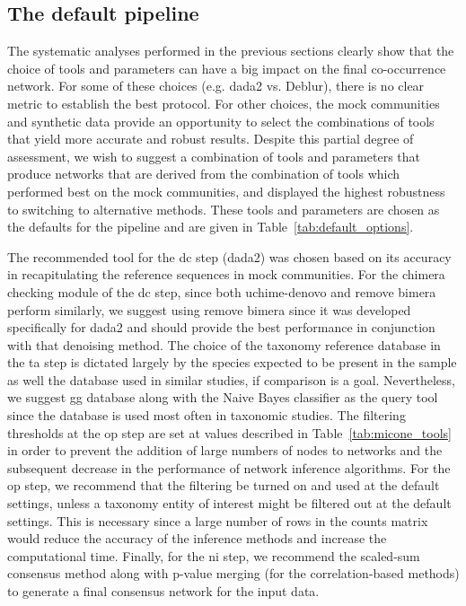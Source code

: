   \FloatBarrier

  \subsection*{The default pipeline}

  The systematic analyses performed in the previous sections clearly show that the choice of tools and parameters can have a big impact on the final co-occurrence network.
  For some of these choices (e.g. \ac{dada2} vs. Deblur), there is no clear metric to establish the best protocol.
  For other choices, the mock communities and synthetic data provide an opportunity to select the combinations of tools that yield more accurate and robust results.
  Despite this partial degree of assessment, we wish to suggest a combination of tools and parameters that produce networks that are derived from the combination of tools which performed best on the mock communities, and displayed the highest robustness to switching to alternative methods.
  These tools and parameters are chosen as the defaults for the pipeline and are given in Table~\ref{tab:default_options}.

  The recommended tool for the \ac{dc} step (\ac{dada2}) was chosen based on its accuracy in recapitulating the reference sequences in mock communities.
  For the chimera checking module of the \ac{dc} step, since both uchime-denovo and remove bimera perform similarly, we suggest using remove bimera since it was developed specifically for \ac{dada2} and should provide the best performance in conjunction with that denoising method.
  The choice of the taxonomy reference database in the \ac{ta} step is dictated largely by the species expected to be present in the sample as well the database used in similar studies, if comparison is a goal.
  Nevertheless, we suggest \ac{gg} database along with the Naive Bayes classifier as the query tool since the database is used most often in taxonomic studies.
  The filtering thresholds at the \ac{op} step are set at values described in Table~\ref{tab:micone_tools} in order to prevent the addition of large numbers of nodes to networks and the subsequent decrease in the performance of network inference algorithms.
  For the \ac{op} step, we recommend that the filtering be turned on and used at the default settings, unless a taxonomy entity of interest might be filtered out at the default settings.
  This is necessary since a large number of rows in the counts matrix would reduce the accuracy of the inference methods and increase the computational time.
  Finally, for the \ac{ni} step, we recommend the scaled-sum consensus method along with p-value merging (for the correlation-based methods) to generate a final consensus network for the input data.

